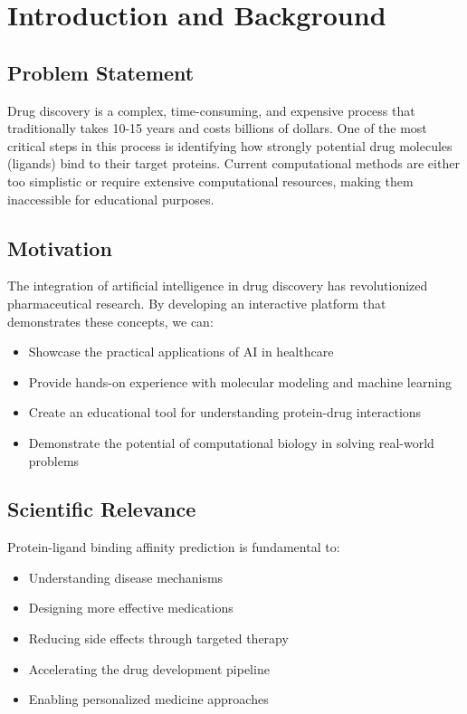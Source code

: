 \documentclass[12pt,a4paper]{article}
\begin{document}
\section{Introduction and Background}

\subsection{Problem Statement}
Drug discovery is a complex, time-consuming, and expensive process that traditionally takes 10-15 years and costs billions of dollars. One of the most critical steps in this process is identifying how strongly potential drug molecules (ligands) bind to their target proteins. Current computational methods are either too simplistic or require extensive computational resources, making them inaccessible for educational purposes.

\subsection{Motivation}
The integration of artificial intelligence in drug discovery has revolutionized pharmaceutical research. By developing an interactive platform that demonstrates these concepts, we can:
\begin{itemize}
    \item Showcase the practical applications of AI in healthcare
    \item Provide hands-on experience with molecular modeling and machine learning
    \item Create an educational tool for understanding protein-drug interactions
    \item Demonstrate the potential of computational biology in solving real-world problems
\end{itemize}

\subsection{Scientific Relevance}
Protein-ligand binding affinity prediction is fundamental to:
\begin{itemize}
    \item Understanding disease mechanisms
    \item Designing more effective medications
    \item Reducing side effects through targeted therapy
    \item Accelerating the drug development pipeline
    \item Enabling personalized medicine approaches
\end{itemize}
\end{document}
